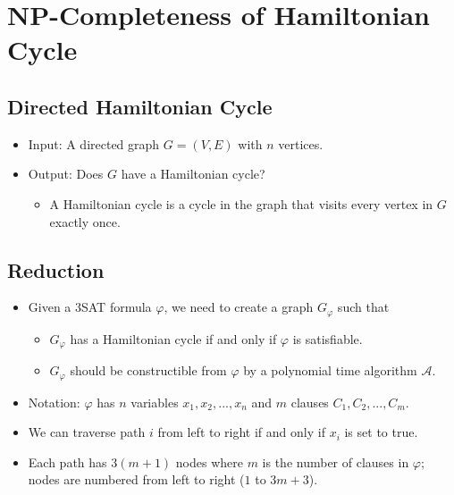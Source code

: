 \documentclass[12pt]{article}
\date{April 27, 2021}
\begin{document}
\maketitle

\section{NP-Completeness of Hamiltonian Cycle}

\subsection{Directed Hamiltonian Cycle}
\begin{itemize}
    \item Input: A directed graph $G = (V, E)$ with $n$ vertices.
    \item Output: Does $G$ have a Hamiltonian cycle?
    \begin{itemize}
        \item A Hamiltonian cycle is a cycle in the graph that visits every vertex in $G$ exactly once.
    \end{itemize}
\end{itemize}

\subsection{Reduction}
\begin{itemize}
    \item Given a 3SAT formula $\varphi$, we need to create a graph $G_\varphi$ such that
    \begin{itemize}
        \item $G_\varphi$ has a Hamiltonian cycle if and only if $\varphi$ is satisfiable.
        \item $G_\varphi$ should be constructible from $\varphi$ by a polynomial time algorithm $\mathcal{A}$.
    \end{itemize}
    \item Notation: $\varphi$ has $n$ variables $x_1, x_2, ..., x_n$ and $m$ clauses $C_1, C_2, ..., C_m$.
    \item We can traverse path $i$ from left to right if and only if $x_i$ is set to true.
    \item Each path has $3(m + 1)$ nodes where $m$ is the number of clauses in $\varphi$; nodes are numbered from left to right ($1$ to $3m + 3$).
\end{itemize}
\end{document}
